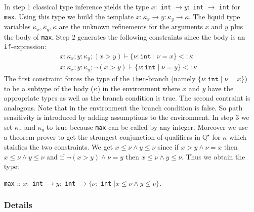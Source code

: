 \documentclass[a4paper,UKenglish]{lipics-v2016}
\begin{document}
In step 1 classical type inference yields the type $x:$ \lstinline{int} $\rightarrow y:$ \lstinline{int} $\rightarrow$ \lstinline{int} for \lstinline{max}.
Using this type we build the template $x: \kappa_x \rightarrow y: \kappa_y \rightarrow \kappa$.
The liquid type variables $\kappa_x, \kappa_y, \kappa$ are the unknown refinements for the arguments $x$ and $y$ plus the body of \lstinline{max}.
Step 2 generates the following constraints since the body is an \lstinline{if}-expression:
\begin{align}
    \label{algn:max}
    x: \kappa_x; y: \kappa_y; (x > y) \vdash \{\nu: \texttt{int} \mid \nu = x \} <: \kappa\\
    x: \kappa_x; y: \kappa_y; \neg(x > y) \vdash \{\nu: \texttt{int} \mid \nu = y \} <: \kappa
\end{align}
The first constraint forces the type of the \lstinline{then}-branch (namely $\{\nu: \texttt{int} \mid \nu = x \}$) to be a subtype
of the body ($\kappa$) in the environment where $x$ and $y$ have the appropriate types as well as the branch condition is true.
The second contraint is analogous.
Note that in the environment the branch condition is false.
So path sensitivity is introduced by adding assumptions to the environment.
In step 3 we set $\kappa_x$ and $\kappa_y$ to true because \lstinline{max} can be called by any integer.
Moreover we use a theorem prover to get the strongest conjunction of qualifiers in $\mathbb{Q}^\star$ for $\kappa$ which staisfies the two constraints.
We get $x \le \nu \land y \le \nu$ since if $x > y \land \nu = x$ then $x \le \nu \land y \le \nu$ and if $\neg(x > y) \land \nu = y$
then $x \le \nu \land y \le \nu$.
Thus we obtain the type:
\begin{center}
    \lstinline{max} :: $x:$ \lstinline{int} $\rightarrow y:$ \lstinline{int} $\rightarrow \{\nu:$ \lstinline{int} $\mid x \le \nu \land y \le \nu\}$.
\end{center}


\subsubsection{Details}
\end{document}
